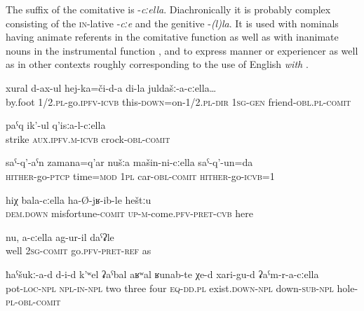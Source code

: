 The suffix of the comitative is -\textit{cːella}. Diachronically it is probably complex consisting of the \textsc{in}-lative -\textit{cːe} and the genitive -\textit{(l)la}. It is used with nominals having animate referents in the comitative function  as well as with inanimate nouns in the instrumental function ,  and to express manner  or experiencer  as well as in other contexts roughly corresponding to the use of English \textit{with} .
%
\begin{exe}
	\ex	\label{ex:we (were) going by foot there with my friends} 
	\gll	xural	d-ax-ul	hej-ka=či-d-a	di-la	juldašː-a-cːella\ldots\\
		by.foot 1/2.\textsc{pl}-go.\textsc{ipfv}-\textsc{icvb} this-\textsc{down}=on-1/2.\textsc{pl}-\textsc{dir} 1\textsc{sg}-\textsc{gen} friend-\textsc{obl}.\textsc{pl}-\textsc{comit}\\
	\glt	{}
	
	\ex	\label{ex:striking with the crock}
	\gll	paˁq ik'-ul q'isːa-l-cːella\\
		strike \textsc{aux.ipfv.m-icvb} crock-\textsc{obl-comit}\\
	\glt	{}
	
	\ex	\label{ex:When we go back, we go by car}
	\gll	saˁ-q'-aˁn	zamana=q'ar	nušːa	mašin-ni-cːella	saˁ-q'-un=da \\
		\textsc{hither}-go-\textsc{ptcp}	time=\textsc{mod}	1\textsc{pl}	car-\textsc{obl}-\textsc{comit}	\textsc{hither}-go-\textsc{icvb}=1\\
	\glt	{}
	
	\ex	\label{ex:when he came here with sorrow}
	\gll	hiχ	bala-cːella	ha-Ø-jʁ-ib-le	heštːu\\
		\textsc{dem.down}	misfortune-\textsc{comit}	\textsc{up}-\textsc{m}-come.\textsc{pfv}-\textsc{pret}-\textsc{cvb}	here\\
	\glt	{}
	
	\ex	\label{ex:as if it happened with you}
	\gll	nu,	a-cːella	ag-ur-il	daˁʡle \\
		well	2\textsc{sg}-\textsc{comit}	go.\textsc{pfv}-\textsc{pret}-\textsc{ref} as\\
	\glt	{}
		
	\ex	\label{ex:Inside the pot there are 2, 3, 4, things like this with holes on the lower side}
	\gll	ħaˁšukː-a-d	d-i-d	k'ʷel	ʡaˁbal	aʁʷal	ʁunab-te	χe-d	xari-gu-d	ʡaˁm-r-a-cːella\\
		pot-\textsc{loc}-\textsc{npl}	\textsc{npl-in}-\textsc{npl} two	three	four	\textsc{eq}-\textsc{dd.pl} 	exist.\textsc{down-npl}	down-\textsc{sub}-\textsc{npl	} hole-\textsc{pl}-\textsc{obl}-\textsc{comit}\\
	\glt	{}
\end{exe}


